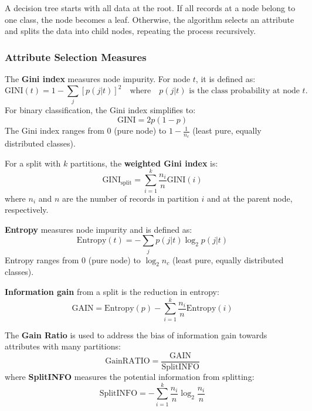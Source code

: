 A decision tree starts with all data at the root. If all records at a node belong to one class, the node becomes a leaf. Otherwise, the algorithm selects an attribute and splits the data into child nodes, repeating the process recursively.

\subsubsection{Attribute Selection Measures}

\begin{definition}
The \textbf{Gini index} measures node impurity. For node $t$, it is defined as:
\begin{equation}
\text{GINI}(t) = 1 - \sum_{j} [p(j|t)]^2 \quad \text{where} \quad p(j|t) \text{ is the class probability at node } t.
\end{equation}
For binary classification, the Gini index simplifies to:
\begin{equation}
\text{GINI} = 2p(1-p)
\end{equation}
The Gini index ranges from 0 (pure node) to $1 - \frac{1}{n_c}$ (least pure, equally distributed classes).

For a split with $k$ partitions, the \textbf{weighted Gini index} is:
\begin{equation}
\text{GINI}_{\text{split}} = \sum_{i=1}^{k} \frac{n_i}{n} \text{GINI}(i)
\end{equation}
where $n_i$ and $n$ are the number of records in partition $i$ and at the parent node, respectively.
\end{definition}

\begin{definition}[entropy]
\textbf{Entropy} measures node impurity and is defined as:
\begin{equation}
\text{Entropy}(t) = -\sum_{j} p(j|t) \log_2 p(j|t)
\end{equation}
Entropy ranges from 0 (pure node) to $\log_2 n_c$ (least pure, equally distributed classes).

\textbf{Information gain} from a split is the reduction in entropy:
\begin{equation}
\text{GAIN} = \text{Entropy}(p) - \sum_{i=1}^{k} \frac{n_i}{n} \text{Entropy}(i)
\end{equation}
\end{definition}

\begin{definition}
The \textbf{Gain Ratio} is used to address the bias of information gain towards attributes with many partitions:
\begin{equation}
\text{GainRATIO} = \frac{\text{GAIN}}{\text{SplitINFO}}
\end{equation}
where \textbf{SplitINFO} measures the potential information from splitting:
\begin{equation}
\text{SplitINFO} = -\sum_{i=1}^{k} \frac{n_i}{n} \log_2 \frac{n_i}{n}
\end{equation}
\end{definition}

